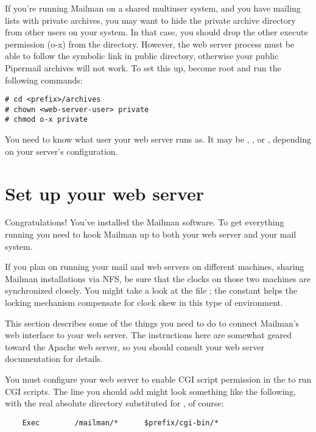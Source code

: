 \documentclass{howto}
\begin{document}
\begin{notice}[warning]
If you're running Mailman on a shared multiuser system, and you have mailing
lists with private archives, you may want to hide the private archive
directory from other users on your system.  In that case, you should drop the
other execute permission (o-x) from the  directory.
However, the web server process must be able to follow the symbolic link in
public directory, otherwise your public Pipermail archives will not work.  To
set this up, become root and run the following commands:

\begin{verbatim}
# cd <prefix>/archives
# chown <web-server-user> private
# chmod o-x private
\end{verbatim}

You need to know what user your web server runs as.  It may be ,
,  or , depending on your server's
configuration.
\end{notice}

\section{Set up your web server}

Congratulations!  You've installed the Mailman software.  To get everything
running you need to hook Mailman up to both your web server and your mail
system.

If you plan on running your mail and web servers on different machines,
sharing Mailman installations via NFS, be sure that the clocks on those two
machines are synchronized closely.  You might take a look at the file
; the constant  helps the locking
mechanism compensate for clock skew in this type of environment.

This section describes some of the things you need to do to connect Mailman's
web interface to your web server.  The instructions here are somewhat geared
toward the Apache web server, so you should consult your web server
documentation for details.

You must configure your web server to enable CGI script permission in the
 to run CGI scripts.  The line you should add
might look something like the following, with the real absolute directory
substituted for , of course:

\begin{verbatim}
    Exec        /mailman/*      $prefix/cgi-bin/*
\end{verbatim}
\end{document}
